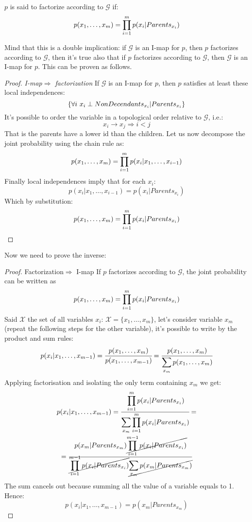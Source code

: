 \begin{theorem}
$p$ is said to factorize according to $\mathcal{G}$ if:
\begin{equation}
	p(x_1,\hdots,x_m)=\displaystyle\prod_{i=1}^mp(x_i\vert Parents_{x_i})
	\label{eq:BayesianNetworkFactorization}
\end{equation}
\label{theo:BayesianNetworkFactorization}
\end{theorem}
Mind that this is a double implication: if $\mathcal{G}$ is an I-map for $p$, then $p$ factorizes according to $\mathcal{G}$, then it's true also that if $p$ factorizes according to $\mathcal{G}$, then $\mathcal{G}$ is an I-map for $p$. 
This can be proven as follows.
\begin{proof}
\textit{I-map$\Rightarrow$ factorization}\newline 
If $\mathcal{G}$ is an I-map for $p$, then $p$ satisfies at least these local independences:
\[
\{\forall i~x_i\perp NonDecendants_{x_i}\vert Parents_{x_i} \}
\]
It's possible to order the variable in a topological order relative to $\mathcal{G}$, i.e.:
\[
x_i\rightarrow x_j\Rightarrow i<j
\]
That is the parents have a lower id than the children. Let us now decompose the joint probability using the chain rule as:
\[
p(x_1,\hdots,x_m)=\displaystyle\prod_{i=1}^mp(x_i\vert x_1,\hdots ,x_{i-1})
\]
Finally local independences imply that for each $x_i$:
\[
p(x_i\vert x_1,\hdots, x_{i-1})=p(x_i\vert Parents_{x_i})
\]
Which by substitution:
\[
p(x_1,\hdots,x_m)=\displaystyle\prod_{i=1}^m p(x_i\vert Parents_{x_i})
\]
\end{proof}
\noindent Now we need to prove the inverse:
\begin{proof}
Factorization$\Rightarrow$ I-map\newline
If $p$ factorizes according to $\mathcal{G}$, the joint probability can be written as 
\[
p(x_1,\hdots,x_m)=\displaystyle\prod_{i=1}^mp(x_i\vert Parents_{x_i})
\]
Said $\mathcal{X}$ the set of all variables $x_i$: $\mathcal{X}=\{x_1,\hdots,x_m\}$, let's consider variable $x_m$ (repeat the following steps for the other variable), it's possible to write by the product and sum rules:
\[
p(x_i\vert x_1,\hdots,x_{m-1})=\cfrac{p(x_1,\hdots,x_{m})}{p(x_1,\hdots,x_{m-1})}=\cfrac{p(x_1,\hdots,x_{m})}{\displaystyle\sum_{x_m}p(x_1,\hdots,x_{m})}
\]
Applying factorisation and isolating the only term containing $x_m$ we get:
\[
	p(x_i\vert x_1,\hdots,x_{m-1})=\cfrac{\displaystyle\prod_{i=1}^mp(x_i\vert Parents_{x_i})}{\displaystyle\sum_{x_m}\displaystyle\prod_{i=1}^mp(x_i\vert Parents_{x_i})}=
\]
\[
	=\cfrac{p(x_m\vert Parents_{x_m})\cancel{\displaystyle\prod_{i=1}^{m-1}p(x_i\vert Parents_{x_i})}}{\cancel{\displaystyle\prod_{i=1}^{m-1}p(x_i\vert Parents_{x_i})} \cancel{\displaystyle\sum_{x_m}p(x_m\vert Parents_{x_m})}}
\]
The sum cancels out because summing all the value of a variable equals to 1. \newline
Hence:
\[
	p(x_i\vert x_1,\hdots,x_{m-1})=p(x_m\vert Parents_{x_m})
\]
\end{proof}
